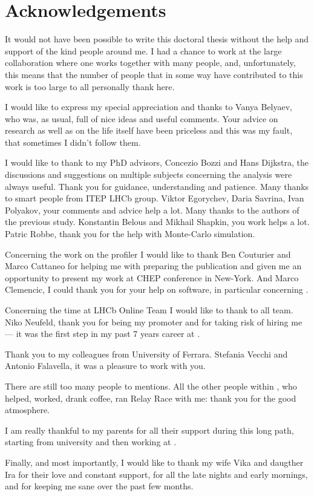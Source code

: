 \chapter*{Acknowledgements}
It would not have been possible to write this doctoral thesis without the help
and support of the kind people around me. I had a chance to work at the large
\lhcb collaboration where one works together with many people, and, unfortunately,
this means that the number of people that in some way have contributed to this
work is too large to all personally thank here.

I would like to express my special appreciation and thanks to Vanya Belyaev,
who was, as usual, full of nice ideas and useful comments. Your advice on
research as well as on the life itself have been priceless and this was my
fault, that sometimes I didn't follow them.

I would like to thank to my PhD advisors, Concezio Bozzi and Hans Dijkstra,
the discussions and suggestions on multiple subjects concerning the analysis
were always useful. Thank you for guidance, understanding and patience.
Many thanks to smart people from ITEP LHCb group. Viktor Egorychev, Daria Savrina,
Ivan Polyakov, your comments and advice help a lot. Many thanks to the authors
of the previous \chib study. Konstantin Belous and Mikhail Shapkin, you work
helps a lot. Patric Robbe, thank  you for the help with Monte-Carlo simulation.


Concerning the work on the profiler I would like to thank Ben Couturier and
Marco Cattaneo for helping me with preparing the publication and given me an
opportunity to present my work at CHEP conference in New-York. And Marco
Clemencic, I could thank you for your help on software, in particular
concerning \gaudi.

Concerning the time at LHCb Online Team I would like to thank to all
team. Niko Neufeld, thank you for being my promoter and for taking risk of 
hiring me --- it was the first step in my past 7 years career at \cern.

Thank you to my colleagues from University of Ferrara. Stefania Vecchi and
Antonio Falavella, it was a pleasure to work with you.

There are still too many people to mentions. All the other people within \lhcb,
who helped, worked, drank coffee, ran Relay Race with me: thank you for the
good atmosphere.

I am really thankful to my parents for all their support during this long path,
starting from university and then working at \cern.

Finally, and most importantly, I would like to thank my wife Vika and daugther
Ira for their love and constant support, for all the late nights and early
mornings, and for keeping me sane over the past few months.


